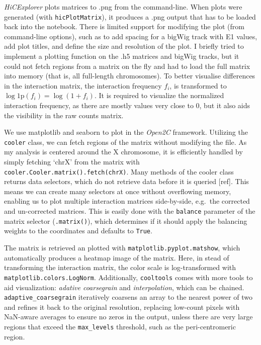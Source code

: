 \documentclass[
  11pt,
  a4paper,
]{scrbook}
\let\oldemph\emph
\renewcommand\emph[1]{\oldemph{\color{gray}#1}}
\begin{document}
\emph{HiCExplorer} plots matrices to .png from the command-line. When
plots were generated (with \texttt{hicPlotMatrix}), it produces a .png
output that has to be loaded back into the notebook. There is limited
support for modifying the plot (from command-line options), such as to
add spacing for a bigWig track with E1 values, add plot titles, and
define the size and resolution of the plot. I briefly tried to implement
a plotting function on the .h5 matrices and bigWig tracks, but it could
not fetch regions from a matrix on the fly and had to load the full
matrix into memory (that is, all full-length chromosomes). To better
visualise differences in the interaction matrix, the interaction
frequency \(f_i\), is transformed to
\(\log\mathrm{1p}(f_i) = \log\left(1 + f_i\right)\). It is required to
visualize the normalized interaction frequency, as there are mostly
values very close to 0, but it also aids the visibility in the raw
counts matrix.

We use matplotlib and seaborn to plot in the \emph{Open2C} framework.
Utilizing the \texttt{cooler} class, we can fetch regions of the matrix
without modifying the file. As my analysis is centered around the X
chromosome, it is efficiently handled by simply fetching `chrX' from the
matrix with
\texttt{cooler.Cooler.matrix().fetch(\textquotesingle{}chrX\textquotesingle{})}.
Many methods of the cooler class returns data selectors, which do not
retrieve data before it is queried {[}ref{]}. This means we can create
many selectors at once without overflowing memory, enabling us to plot
multiple interaction matrices side-by-side, e.g.~the corrected and
un-corrected matrices. This is easily done with the \texttt{balance}
parameter of the matrix selector (\texttt{.matrix()}), which determines
if it should apply the balancing weights to the coordinates and defaults
to \texttt{True}.

The matrix is retrieved an plotted with
\texttt{matplotlib.pyplot.matshow}, which automatically produces a
heatmap image of the matrix. Here, in stead of transforming the
interaction matrix, the color scale is log-transformed with
\texttt{matplotlib.colors.LogNorm}. Additionally, \texttt{cooltools}
comes with more tools to aid visualization: \emph{adative coarsegrain}
and \emph{interpolation}, which can be chained.
\texttt{adaptive\_coarsegrain} iteratively coarsens an array to the
nearest power of two and refines it back to the original resolution,
replacing low-count pixels with NaN-aware averages to ensure no zeros in
the output, unless there are very large regions that exceed the
\texttt{max\_levels} threshold, such as the peri-centromeric region.
\end{document}
